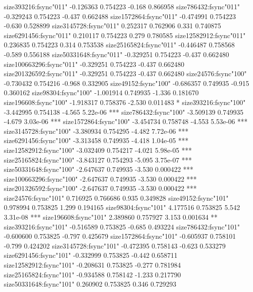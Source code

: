 \documentclass[11pt]{article}
\begin{document}
\begin{Schunk}
\begin{Soutput}
size393216:fsync"011"          -0.126363   0.754223  -0.168 0.866958    
size786432:fsync"011"          -0.329243   0.754223  -0.437 0.662488    
size1572864:fsync"011"         -0.474991   0.754223  -0.630 0.528899    
size3145728:fsync"011"          0.252317   0.762906   0.331 0.740875    
size6291456:fsync"011"          0.210117   0.754223   0.279 0.780585    
size12582912:fsync"011"         0.236835   0.754223   0.314 0.753538    
size25165824:fsync"011"        -0.446487   0.758568  -0.589 0.556188    
size50331648:fsync"011"        -0.329251   0.754223  -0.437 0.662480    
size100663296:fsync"011"       -0.329251   0.754223  -0.437 0.662480    
size201326592:fsync"011"       -0.329251   0.754223  -0.437 0.662480    
size24576:fsync"100"           -0.730432   0.754216  -0.968 0.332905    
size49152:fsync"100"           -0.686357   0.749935  -0.915 0.360162    
size98304:fsync"100"           -1.001914   0.749935  -1.336 0.181670    
size196608:fsync"100"          -1.918317   0.758376  -2.530 0.011483 *  
size393216:fsync"100"          -3.442995   0.754138  -4.565 5.22e-06 ***
size786432:fsync"100"          -3.509139   0.749935  -4.679 3.03e-06 ***
size1572864:fsync"100"         -3.454734   0.758748  -4.553 5.53e-06 ***
size3145728:fsync"100"         -3.380934   0.754295  -4.482 7.72e-06 ***
size6291456:fsync"100"         -3.313458   0.749935  -4.418 1.04e-05 ***
size12582912:fsync"100"        -3.032409   0.754217  -4.021 5.98e-05 ***
size25165824:fsync"100"        -3.843127   0.754293  -5.095 3.75e-07 ***
size50331648:fsync"100"        -2.647637   0.749935  -3.530 0.000422 ***
size100663296:fsync"100"       -2.647637   0.749935  -3.530 0.000422 ***
size201326592:fsync"100"       -2.647637   0.749935  -3.530 0.000422 ***
size24576:fsync"101"            0.716925   0.766686   0.935 0.349828    
size49152:fsync"101"            0.978994   0.753825   1.299 0.194165    
size98304:fsync"101"            4.177516   0.753825   5.542 3.31e-08 ***
size196608:fsync"101"           2.389860   0.757927   3.153 0.001634 ** 
size393216:fsync"101"          -0.516589   0.753825  -0.685 0.493224    
size786432:fsync"101"          -0.600600   0.753825  -0.797 0.425679    
size1572864:fsync"101"         -0.605937   0.758101  -0.799 0.424202    
size3145728:fsync"101"         -0.472395   0.758143  -0.623 0.533279    
size6291456:fsync"101"         -0.332999   0.753825  -0.442 0.658711    
size12582912:fsync"101"        -0.208631   0.753825  -0.277 0.781984    
size25165824:fsync"101"        -0.934588   0.758142  -1.233 0.217790    
size50331648:fsync"101"         0.260902   0.753825   0.346 0.729293    

\end{Soutput}
\end{Schunk}
\end{document}
